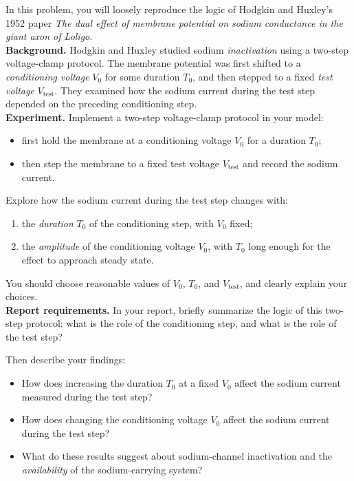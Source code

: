 \documentclass{article}
\begin{document}
In this problem, you will loosely reproduce the logic of Hodgkin and Huxley's 1952 paper
\textit{The dual effect of membrane potential on sodium conductance in the giant axon of Loligo}.\\

\noindent\textbf{Background.}
Hodgkin and Huxley studied sodium \emph{inactivation} using a two-step voltage-clamp protocol.
The membrane potential was first shifted to a \emph{conditioning voltage} $V_0$ for some duration $T_0$,
and then stepped to a fixed \emph{test voltage} $V_{\mathrm{test}}$.
They examined how the sodium current during the test step depended on the preceding conditioning step. \\

\noindent\textbf{Experiment.}
Implement a two-step voltage-clamp protocol in your model:

\begin{itemize}
    \item first hold the membrane at a conditioning voltage $V_0$ for a duration $T_0$;
    \item then step the membrane to a fixed test voltage $V_{\mathrm{test}}$ and record the sodium current.
\end{itemize}

Explore how the sodium current during the test step changes with:

\begin{enumerate}
    \item the \emph{duration} $T_0$ of the conditioning step, with $V_0$ fixed;
    \item the \emph{amplitude} of the conditioning voltage $V_0$, with $T_0$ long enough for the effect to approach steady state.
\end{enumerate}

You should choose reasonable values of $V_0$, $T_0$, and $V_{\mathrm{test}}$, and clearly explain your choices.\\

\noindent\textbf{Report requirements.}
In your report, briefly summarize the logic of this two-step protocol:
what is the role of the conditioning step, and what is the role of the test step?

Then describe your findings:

\begin{itemize}
    \item How does increasing the duration $T_0$ at a fixed $V_0$ affect the sodium current measured during the test step?
    \item How does changing the conditioning voltage $V_0$ affect the sodium current during the test step?
    \item What do these results suggest about sodium-channel inactivation and the \emph{availability} of the sodium-carrying system?
\end{itemize}
\end{document}
